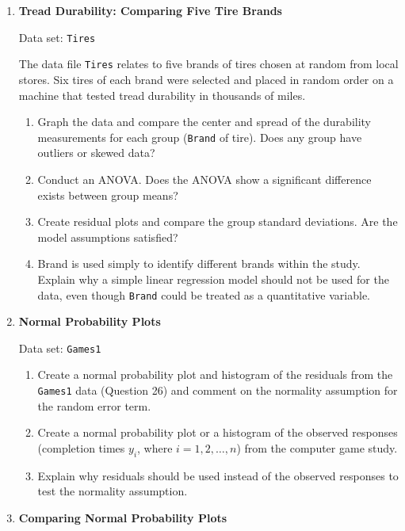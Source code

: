 \documentclass[
]{report}
\begin{document}
\begin{enumerate}
  \item \textbf{Tread Durability: Comparing Five Tire Brands}

Data set: \texttt{Tires}

The data file \texttt{Tires} relates to five brands of tires chosen at random from local stores. Six tires of each brand were selected and placed in random order on a machine that tested tread durability in thousands of miles.

  \begin{enumerate}
    \item Graph the data and compare the center and spread of the durability measurements for each group (\texttt{Brand} of tire). Does any group have outliers or skewed data?
      \item Conduct an ANOVA. Does the ANOVA show a significant difference exists between group means?
      \item Create residual plots and compare the group standard deviations. Are the model assumptions satisfied?
      \item Brand is used simply to identify different brands within the study. Explain why a simple linear regression model should not be used for the data, even though \texttt{Brand} could be treated as a quantitative variable.
    \end{enumerate}

  \item \textbf{Normal Probability Plots}

Data set: \texttt{Games1}

  \begin{enumerate}
    \item Create a normal probability plot and histogram of the residuals from the \texttt{Games1} data (Question 26) and comment on the normality assumption for the random error term.
      \item Create a normal probability plot or a histogram of the observed responses (completion times $\scriptstyle y_i$, where $\scriptstyle i = 1, 2, \ldots, n$) from the computer game study.
      \item Explain why residuals should be used instead of the observed responses to test the normality assumption.
    \end{enumerate}

  \item \textbf{Comparing Normal Probability Plots}


\end{enumerate}
\end{document}
